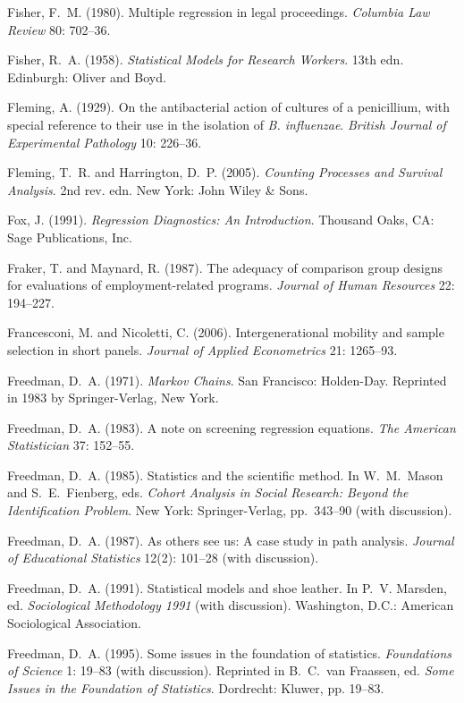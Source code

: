 \smallskip\noindent
Fisher, F.~M. (1980).
Multiple regression in legal proceedings.
{\it Columbia Law Review\/} 80: 702--36.

\smallskip\noindent
Fisher, R.~A. (1958).
{\it Statistical Models for Research Workers\/}. 13th edn.
Edinburgh: Oliver and Boyd.

\smallskip\noindent
Fleming, A. (1929).
On the antibacterial action of cultures of a penicillium,
with special reference to their use in the isolation of {\it B. influenzae\/}.
{\it British Journal of Experimental Pathology\/} 10: 226--36.

\smallskip\noindent
Fleming, T.~R. and Harrington, D.~P. (2005).
{\it Counting Processes and Survival Analysis\/}.
2nd rev. edn.
New York: John Wiley \& Sons.

\smallskip\noindent
Fox, J. (1991).
{\it Regression Diagnostics: An Introduction\/}.
Thousand Oaks, CA: Sage Publications, Inc.

\smallskip\noindent
Fraker, T. and Maynard, R. (1987).
The adequacy of comparison group designs for evaluations of employment-related programs.
{\it Journal of Human Resources\/} 22: 194--227.

\smallskip\noindent
Francesconi, M. and Nicoletti, C. (2006).
Intergenerational mobility and sample selection in short panels.
{\it Journal of Applied Econometrics\/} 21: 1265--93.

\smallskip\noindent
Freedman, D.~A. (1971).
{\it Markov Chains\/}.
San Francisco: Holden-Day.
Re\-printed in 1983 by Springer-Verlag, New York.

\smallskip\noindent
Freedman, D.~A. (1983).
A note on screening regression equations.
{\it The American Statistician\/} 37: 152--55.

\smallskip\noindent
Freedman, D.~A. (1985).
Statistics and the scientific method.
In W.~M.~Mason and S.~E.~Fienberg, eds.
{\it Cohort Analysis in Social Research: Beyond the Identification Problem\/}.
New York: Spring\-er-Verlag, pp.~343--90 (with discussion).

\smallskip\noindent
Freedman, D.~A. (1987).
As others see us: A case study in path analysis.
{\it Journal of Educational Statistics\/} 12(2): 101--28 (with discussion).

\smallskip\noindent
Freedman, D.~A. (1991).
Statistical models and shoe leather.
In P.~V. Marsden, ed.
{\it Sociological Methodology 1991\/} (with discussion).
Washington, D.C.: American Sociological Association.

\smallskip\noindent
Freedman, D.~A. (1995).
Some issues in the foundation of statistics.
{\it Foundations of Science\/} 1: 19--83 (with discussion).
Reprinted in B.~C.~van Fraassen, ed.
{\it Some Issues in the Foundation of Statistics\/}.
Dordrecht: Kluwer, pp. 19--83.

